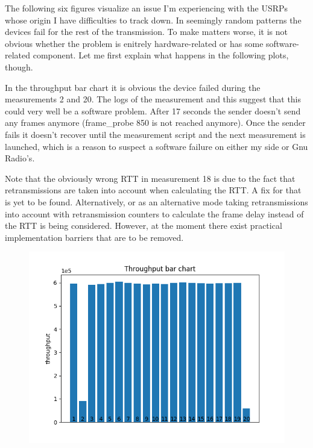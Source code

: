 \documentclass{article}
\begin{document}
The following six figures visualize an issue I'm experiencing with the USRPs whose origin I have difficulties to track down. In seemingly random patterns the devices fail for the rest of the transmission. To make matters worse, it is not obvious whether the problem is enitrely hardware-related or has some software-related component. Let me first explain what happens in the following plots, though.

\bigskip

In the throughput bar chart it is obvious the device failed during the measurements 2 and 20. The logs of the measurement and this suggest that this could very well be a software problem.
After 17 seconds the sender doesn't send any frames anymore (frame\_probe 850 is not reached anymore). Once the sender fails it doesn't recover until the measurement script and the next measurement is launched, which is a reason to suspect a software failure on either my side or Gnu Radio's. 

\bigskip

Note that the obviously wrong RTT in measurement 18 is due to the fact that retransmissions are
taken into account when calculating the RTT. A fix for that is yet to  be found. Alternatively, or as an alternative mode taking retransmissions into account with retransmission counters to calculate the frame delay instead of the RTT is being considered. However, at the moment there exist practical implementation barriers that are to be removed.

\begin{figure}[h] \label{usrp-fails-4}
	\includegraphics[width=\textwidth]{usrp_fail_tp_bar}	
\end{figure}
\end{document}
